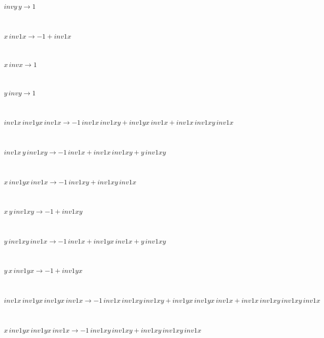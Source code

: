 \begin{minipage}{6in}
$
invy\,
 y\rightarrow 1
$
\end{minipage}\medskip \\
\begin{minipage}{6in}
$
x\,
 inv1x\rightarrow -1 + inv1x
$
\end{minipage}\medskip \\
\begin{minipage}{6in}
$
x\,
 invx\rightarrow 1
$
\end{minipage}\medskip \\
\begin{minipage}{6in}
$
y\,
 invy\rightarrow 1
$
\end{minipage}\medskip \\
\begin{minipage}{6in}
$
inv1x\,
 inv1yx\,
 inv1x\rightarrow -1\,
 inv1x\,
 inv1xy + inv1yx\,
 inv1x + inv1x\,
 inv1xy\,
 inv1x
$
\end{minipage}\medskip \\
\begin{minipage}{6in}
$
inv1x\,
 y\,
 inv1xy\rightarrow -1\,
 inv1x + inv1x\,
 inv1xy + y\,
 inv1xy
$
\end{minipage}\medskip \\
\begin{minipage}{6in}
$
x\,
 inv1yx\,
 inv1x\rightarrow -1\,
 inv1xy + inv1xy\,
 inv1x
$
\end{minipage}\medskip \\
\begin{minipage}{6in}
$
x\,
 y\,
 inv1xy\rightarrow -1 + inv1xy
$
\end{minipage}\medskip \\
\begin{minipage}{6in}
$
y\,
 inv1xy\,
 inv1x\rightarrow -1\,
 inv1x + inv1yx\,
 inv1x + y\,
 inv1xy
$
\end{minipage}\medskip \\
\begin{minipage}{6in}
$
y\,
 x\,
 inv1yx\rightarrow -1 + inv1yx
$
\end{minipage}\medskip \\
\begin{minipage}{6in}
$
inv1x\,
 inv1yx\,
 inv1yx\,
 inv1x\rightarrow -1\,
 inv1x\,
 inv1xy\,
 inv1xy + inv1yx\,
 inv1yx\,
 inv1x + inv1x\,
 inv1xy\,
 inv1xy\,
 inv1x
$
\end{minipage}\medskip \\
\begin{minipage}{6in}
$
x\,
 inv1yx\,
 inv1yx\,
 inv1x\rightarrow -1\,
 inv1xy\,
 inv1xy + inv1xy\,
 inv1xy\,
 inv1x
$
\end{minipage}\medskip \\
